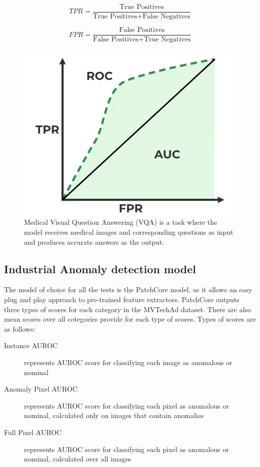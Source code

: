 \begin{equation}
	TPR = \frac{\text{True Positives}}{\text{True Positives} + \text{False Negatives}}
	\label{eq:tpr}
\end{equation}

\begin{equation}
	FPR = \frac{\text{False Positives}}{\text{False Positives} + \text{True Negatives}}
	\label{eq:fpr}
\end{equation}

\begin{figure}[h]
	\begin{center}
		\includegraphics[width=0.5\linewidth]{Chapter_4/auroc.png}
	\end{center}
	\caption{Medical Visual Question Answering (VQA) \cite{liu2021slake} is a task where the model receives medical images and corresponding questions as input and produces accurate answers as the output.}
	\label{fig:auroc}
\end{figure}

\subsection{Industrial Anomaly detection model}
The model of choice for all the tests is the PatchCore model, as it allows an easy plug and play approach to pre-trained feature extractors. PatchCore outputs three types of scores for each category in the MVTechAd dataset. There are also mean scores over all cotegories provide for each type of scores. Types of scores are as follows:

\begin{description}
  \item[Instance AUROC] represents AUROC score for classifying each image as anomalous or nominal
  \item[Anomaly Pixel AUROC] represents AUROC score for classifying each pixel as anomalous or nominal, calculated only on images that contain anomalies
  \item[Full Pixel AUROC] represents AUROC score for classifying each pixel as anomalous or nominal, calculated over all images
\end{description}

